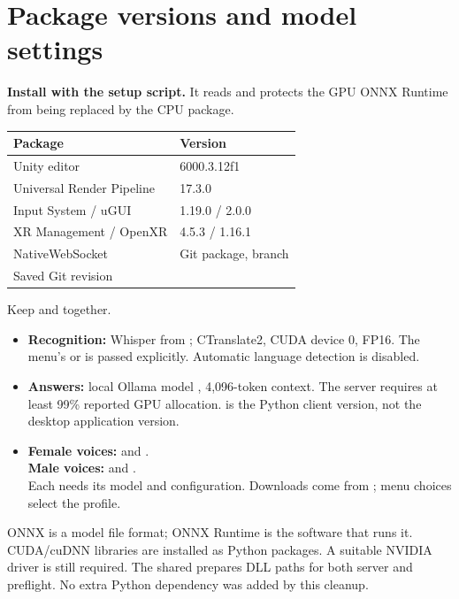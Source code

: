 \section{Package versions and model settings}
\begingroup\fontsize{9.5}{11.5}\selectfont\raggedright
\textbf{Install with the setup script.} It reads 
and protects the GPU ONNX Runtime from being replaced by the CPU package.

\begin{multicols}{2}

\end{multicols}

\begin{tabularx}{\linewidth}{@{}P{49mm}Y@{}}
\toprule
Package & Version\\
\midrule
Unity editor & 6000.3.12f1\\
Universal Render Pipeline & 17.3.0\\
Input System / uGUI & 1.19.0 / 2.0.0\\
XR Management / OpenXR & 4.5.3 / 1.16.1\\
NativeWebSocket & Git package, branch \\
Saved Git revision & \\
\bottomrule
\end{tabularx}
Keep  and  together.

\begin{itemize}
\item \textbf{Recognition:} Whisper  from
; CTranslate2, CUDA device 0, FP16.
The menu's  or  is passed explicitly. Automatic language
detection is disabled.
\item \textbf{Answers:} local Ollama model , 4,096-token
context. The server requires at least 99\% reported GPU allocation.
 is the Python client version, not the desktop application version.
\item \textbf{Female voices:}  and .\\
\textbf{Male voices:}  and .\\
Each needs its  model and  configuration.
Downloads come from ; menu choices select the profile.
\end{itemize}
ONNX is a model file format; ONNX Runtime is the software that runs it.
CUDA/cuDNN libraries are installed as Python packages. A suitable NVIDIA driver
is still required. The shared  prepares DLL paths for
both server and preflight. No extra Python dependency was added by this cleanup.
\endgroup
